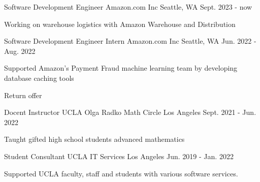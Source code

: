 

\begin{cventries}



\cventry
{Software Development Engineer} %
{Amazon.com Inc} %
{Seattle, WA} %
{Sept. 2023 - now} %
{
    \begin{cvitems}
        \item Working on warehouse logistics with Amazon Warehouse and Distribution
    \end{cvitems}
}

  \cventry
    {Software Development Engineer Intern} %
    {Amazon.com Inc} %
    {Seattle, WA} %
    {Jun. 2022 - Aug. 2022} %
    {
        \begin{cvitems}
            \item Supported Amazon's Payment Fraud machine learning team by developing database caching tools
            \item Return offer
        \end{cvitems}
    }


  \cventry
    {Docent Instructor} %
    {UCLA Olga Radko Math Circle} %
    {Los Angeles} %
    {Sept. 2021 - Jun. 2022} %
    {
        \begin{cvitems}
            \item Taught gifted high school students advanced mathematics
        \end{cvitems}
    }

  \cventry
    {Student Consultant} %
    {UCLA IT Services} %
    {Los Angeles} %
    {Jun. 2019 - Jan. 2022} %
    {
        \begin{cvitems}
            \item Supported UCLA faculty, staff and students with various software services.
        \end{cvitems}
    }
    


\end{cventries}

